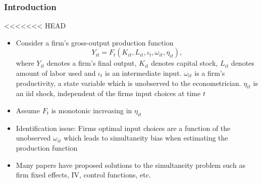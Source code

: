 \documentclass{beamer}
\begin{document}
\begin{frame}
\frametitle{Introduction}
<<<<<<< HEAD
\begin{itemize} 
\item Consider a firm's gross-output production function
\begin{equation} \label{production}
Y_{it}=F_{t}(K_{it}, L_{it}, \iota_{t}, \omega_{it}, \eta_{it}),
\end{equation}
where $Y_{it}$ denotes a firm's final output, $K_{it}$ denotes capital stock, $L_{it}$ denotes amount of labor used and $\iota_{t}$ is an intermediate input. $\omega_{it}$ is a firm's productivity, a state variable which is unobserved to the econometrician. $\eta_{it}$ is an iid shock, independent of the firms input choices at time $t$
\item Assume $F_{t}$ is monotonic increasing in $\eta_{it}$
\item Identification issue: Firms optimal input choices are a function of the unobserved $\omega_{it}$ which leads to simultaneity bias when estimating the production function
\item Many papers have proposed solutions to the simultaneity problem such as firm fixed effects, IV, control functions, etc.
\end{itemize}
\end{frame}
\end{document}
